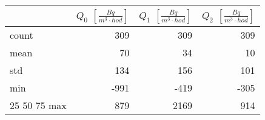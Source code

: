 \begin{tabular}{lrrr}
\toprule
{} &  $Q_0$ $\left[\si{\frac{Bq}{m^3\cdot hod}}\right]$ &  $Q_1$ $\left[\si{\frac{Bq}{m^3\cdot hod}}\right]$ &  $Q_2$ $\left[\si{\frac{Bq}{m^3\cdot hod}}\right]$ \\
\midrule
count &                                                309 &                                                309 &                                                309 \\
mean  &                                                 70 &                                                 34 &                                                 10 \\
std   &                                                134 &                                                156 &                                                101 \\
min   &                                               -991 &                                               -419 &                                               -305 \\
25%
50%
75%
max   &                                                879 &                                               2169 &                                                914 \\
\bottomrule
\end{tabular}
